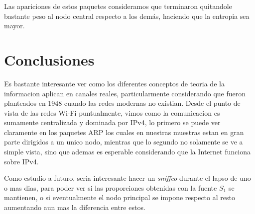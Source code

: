 Las apariciones de estos paquetes consideramos que terminaron quitandole bastante peso al nodo central respecto a los demás, haciendo que la entropia sea mayor.

\section{Conclusiones}

Es bastante interesante ver como los diferentes conceptos de teoria de la informacion aplican en canales reales, particularmente considerando que fueron planteados en 1948 cuando las redes modernas no existian. Desde el punto de vista de las redes Wi-Fi puntualmente, vimos como la comunicacion es sumamente centralizada y dominada por IPv4, lo primero se puede ver claramente en los paquetes ARP los cuales en nuestras muestras estan en gran parte dirigidos a un unico nodo, mientras que lo segundo no solamente se ve a simple vista, sino que ademas es esperable considerando que la Internet funciona sobre IPv4.

Como estudio a futuro, seria interesante hacer un \textit{sniffeo} durante el lapso de uno o mas dias, para poder ver si las proporciones obtenidas con la fuente $S_1$ se mantienen, o si eventualmente el nodo principal se impone respecto al resto aumentando aun mas la diferencia entre estos.

%
%
